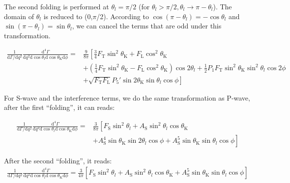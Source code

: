 The second folding is performed at $\theta_l = \pi/2$ (for
$\theta_l>\pi/2,\theta_l\rightarrow \pi- \theta_l$). The domain of
$\theta_l$ is reduced to (0,$\pi$/2). According to $\cos(\pi-\theta_l) = -
\cos\theta_l$ and $\sin(\pi-\theta_l) = \sin\theta_l$, we can cancel the terms that are odd under this transformation.


\begin{equation} \label{eq:fold2}
    \begin{split}
        \frac{1}{\mathrm{d}\Gamma/\mathrm{d}q^2}\frac{\mathrm{d}^4\Gamma}{\mathrm{d}q^2 \mathrm{d}\cos\theta_l \mathrm{d}\cos\theta_\mathrm{K} \mathrm{d}\phi} =&\frac{9}{8\pi}\left[\frac{3}{4}F_\mathrm{T}\sin^2\theta_\mathrm{K} + F_\mathrm{L}\cos^2\theta_\mathrm{K} \right.\\
            &\left.+(\frac{1}{4}F_\mathrm{T}\sin^2\theta_\mathrm{K}-F_\mathrm{L}\cos^2\theta_\mathrm{K})\cos2\theta_l+\frac{1}{2}P_1F_\mathrm{T}\sin^2\theta_\mathrm{K}\sin^2\theta_l\cos 2\phi \right.\\
            &\left.+\sqrt{F_\mathrm{T}F_\mathrm{L}}P_5'\sin2\theta_\mathrm{K}\sin\theta_l\cos\phi  \right]
    \end{split}
\end{equation}

 For S-wave and the
interference terms, we do the same transformation as P-wave, after the
first ``folding'', it can reads:

\begin{equation} \label{eq:S-fold1}
    \begin{split}
        \frac{1}{\mathrm{d}\Gamma/\mathrm{d}q^2}\frac{\mathrm{d}^4\Gamma}{\mathrm{d}q^2 \mathrm{d}\cos\theta_l \mathrm{d}\cos\theta_\mathrm{K} \mathrm{d}\phi} =&\frac{3}{8\pi}\left[F_\mathrm{S}\sin^2\theta_l+ A_\mathrm{S}\sin^2\theta_l\cos\theta_\mathrm{K}\right.\\
            &+\left. A_\mathrm{S}^4\sin\theta_\mathrm{K}\sin2\theta_l\cos\phi + A^5_\mathrm{S}\sin\theta_\mathrm{K}\sin\theta_l\cos\phi\right]
    \end{split}
\end{equation}

After the second ``folding'', it reads:
\begin{equation} \label{eq:S-fold2}
    \begin{split}
        \frac{1}{\mathrm{d}\Gamma/\mathrm{d}q^2}\frac{\mathrm{d}^4\Gamma}{\mathrm{d}q^2 \mathrm{d}\cos\theta_l \mathrm{d}\cos\theta_\mathrm{K} \mathrm{d}\phi} =\frac{3}{4\pi}\left[F_\mathrm{S}\sin^2\theta_l+A_\mathrm{S}\sin^2\theta_l\cos\theta_\mathrm{K}+A^5_\mathrm{S}\sin\theta_\mathrm{K}\sin\theta_l\cos\phi\right]
    \end{split}
\end{equation}

